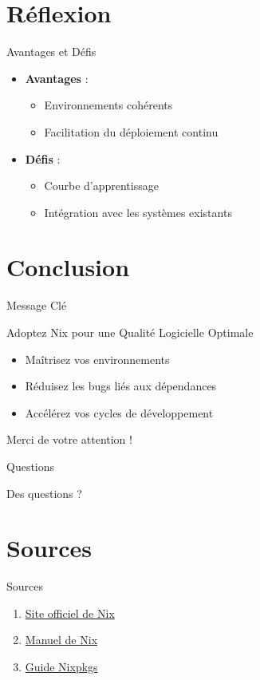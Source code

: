 \documentclass{beamer}
\begin{document}
\section{Réflexion}

\begin{frame}{Avantages et Défis}
	\begin{itemize}
		\item \textbf{Avantages} :
		      \begin{itemize}
			      \item Environnements cohérents
			      \item Facilitation du déploiement continu
		      \end{itemize}
		\item \textbf{Défis} :
		      \begin{itemize}
			      \item Courbe d'apprentissage
			      \item Intégration avec les systèmes existants
		      \end{itemize}
	\end{itemize}
\end{frame}

\section{Conclusion}

\begin{frame}{Message Clé}
	\begin{block}{Adoptez Nix pour une Qualité Logicielle Optimale}
		\begin{itemize}
			\item Maîtrisez vos environnements
			\item Réduisez les bugs liés aux dépendances
			\item Accélérez vos cycles de développement
		\end{itemize}
	\end{block}
	\begin{center}
		\Large Merci de votre attention !
	\end{center}
\end{frame}

\begin{frame}{Questions}
	\begin{center}
		\Large Des questions ?
	\end{center}
\end{frame}

\appendix

\section{Sources}

\begin{frame}{Sources}
	\begin{enumerate}
		\item \href{https://nixos.org/}{Site officiel de Nix}
		\item \href{https://nixos.org/manual/nix/stable/}{Manuel de Nix}
		\item \href{https://nixos.org/manual/nixpkgs/stable/}{Guide Nixpkgs}
	\end{enumerate}
\end{frame}
\end{document}
